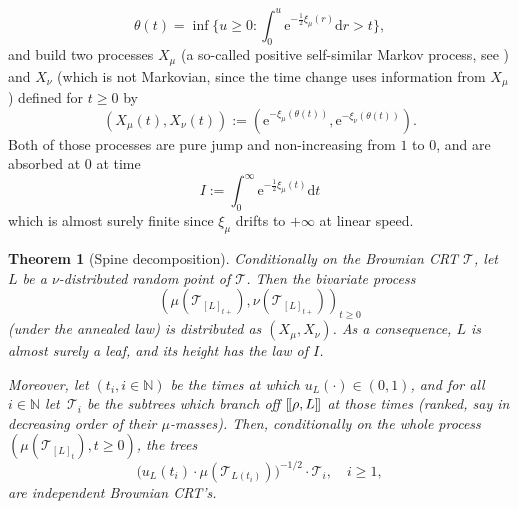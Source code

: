 \documentclass[JEP,XML,SOM,Unicode,NoFloatCountersInSection, NoEqCountersInSection,published]{cedram}
\newcommand{\N}{\mathbb{N}}
\newcommand{\T}{\mathcal{T}}\let\CRT\T\let\tbr\T
\def\llbracket{[\hspace{-.10em} [ }
\def\rrbracket{ ] \hspace{-.10em}]}
\newtheorem{thm}{Theorem}[section]
\theoremstyle{definition}
\begin{document}
\begin{equation}\label{eq:timechange}\theta(t)=\inf\biggl\{u\geq 0: \int_0^u \mathrm{e}^{-\frac12 \xi_{\mu}(r)}\mathrm d r > t\biggr\},\end{equation}
and build two processes $X_\mu$ (a so-called positive self-similar Markov process, see \cite{Lamp62}) and $X_\nu$ (which is not Markovian, since the time change uses information from $X_\mu$) defined for $t\geq0$ by
\begin{equation}
(X_{\mu}(t),X_\nu(t)):=(\mathrm{e}^{-\xi_\mu(\theta(t))},\mathrm{e}^{-\xi_\nu(\theta(t))}). \label{eq:lamperti}\end{equation}
Both of those processes are pure jump and non-increasing from $1$ to $0$, and are absorbed at $0$ at time \begin{equation} \label{def:I} I:=\int_{0}^{\infty}\mathrm{e}^{-\frac12 \xi_\mu(t)}\mathrm{d}t\end{equation} which is almost surely finite since $ \xi_\mu$ drifts to $+\infty$ at linear speed.

\begin{thm}[Spine decomposition]\label{thm:spinedec} Conditionally on the Brownian CRT $ \mathcal{T}$, let~$L$ be a $\nu$-distributed random point of $\tbr$. Then the bivariate process
\[
(\mu(\T_{[L]_{t+}}),\nu(\T_{[L]_{t+}}))_{t\geq 0}
\]
(under the annealed law) is distributed as $(X_{\mu},X_{\nu})$.
As a consequence, $L$ is almost surely a leaf, and its height has the law of $I$.

Moreover, let $(t_i,i\in\N)$ be the times at which $u_L(\cdot) \in (0,1)$, and for all $i\in \N$ let~$\T_i$ be the subtrees which branch off $\llbracket \rho,L\rrbracket$ at those times (ranked, say in decreasing order of their $\mu$-masses). Then, conditionally on the whole process $(\mu(\T_{[L]_{t}}),t\geq 0)$, the trees
\[
\big(u_L(t_i) \cdot \mu(\T_{L(t_i)}) \big)^{-1/2} \cdot \T_i, \quad i \geq 1,
\]
are independent Brownian CRT's.
\end{thm}
\end{document}

